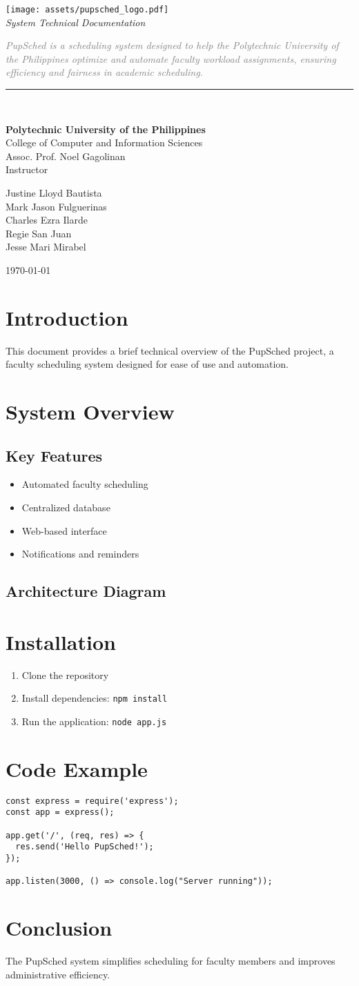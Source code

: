 \documentclass[12pt,letterpaper]{article}
\newcommand{\coverpage}{
\begin{titlepage}
    \centering
    \vspace*{1cm}
    \texttt{[image: assets/pupsched\_logo.pdf]}\\[0.5cm]
    {\large\sffamily\itshape System Technical Documentation}\\[6cm]
    
    \begin{flushleft}
        \begin{minipage}{\textwidth}
            {\sffamily\itshape\textcolor{gray}{
            PupSched is a scheduling system designed to help the Polytechnic University of the Philippines 
            optimize and automate faculty workload assignments, ensuring efficiency and fairness in academic scheduling.}}
        \end{minipage}
    \end{flushleft}
    
    \vspace{1.5cm}
    \noindent\rule{\textwidth}{0.4pt}\\[1.5cm]
    
    \begin{minipage}[t]{0.48\textwidth}
        \raggedright
        {\normalsize \textbf{Polytechnic University of the Philippines}}\\[0.2cm]
        {\normalsize College of Computer and Information Sciences}\\[1cm]
        
        {\normalsize Assoc. Prof. Noel Gagolinan}\\
        {\normalsize Instructor}\\[0.1cm]
    \end{minipage}
    \hfill
    \begin{minipage}[t]{0.48\textwidth}
        \raggedleft
        {\normalsize Justine Lloyd Bautista}\\
        {\normalsize Mark Jason Fulguerinas}\\
        {\normalsize Charles Ezra Ilarde}\\
        {\normalsize Regie San Juan}\\
        {\normalsize Jesse Mari Mirabel}\\
    \end{minipage}
    
    \vfill
    \centering
    {\normalsize \today}
\end{titlepage}
}
\begin{document}
\coverpage  %

\section{Introduction}
This document provides a brief technical overview of the PupSched project, a faculty scheduling system designed for ease of use and automation.

\section{System Overview}
\subsection{Key Features}
\begin{itemize}
    \item Automated faculty scheduling
    \item Centralized database
    \item Web-based interface
    \item Notifications and reminders
\end{itemize}

\subsection{Architecture Diagram}
\begin{center}
\end{center}

\section{Installation}
\begin{enumerate}
    \item Clone the repository
    \item Install dependencies: \texttt{npm install}
    \item Run the application: \texttt{node app.js}
\end{enumerate}

\section{Code Example}
\begin{lstlisting}[caption={Sample Node.js Code}]
const express = require('express');
const app = express();

app.get('/', (req, res) => {
  res.send('Hello PupSched!');
});

app.listen(3000, () => console.log("Server running"));
\end{lstlisting}

\section{Conclusion}
The PupSched system simplifies scheduling for faculty members and improves administrative efficiency.
\end{document}
